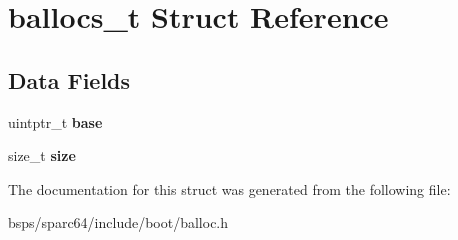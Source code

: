 \hypertarget{structballocs__t}{}\section{ballocs\+\_\+t Struct Reference}
\label{structballocs__t}
\subsection*{Data Fields}
\begin{DoxyCompactItemize}
\item 
\mbox{\label{structballocs__t_aced1a1ab8ac46a81637d4c823cdf82e1}} 
uintptr\+\_\+t {\bfseries base}
\item 
\mbox{\label{structballocs__t_a8441059cf7d587ef272a70a149feb03c}} 
size\+\_\+t {\bfseries size}
\end{DoxyCompactItemize}


The documentation for this struct was generated from the following file\+:\begin{DoxyCompactItemize}
\item 
bsps/sparc64/include/boot/balloc.\+h\end{DoxyCompactItemize}
